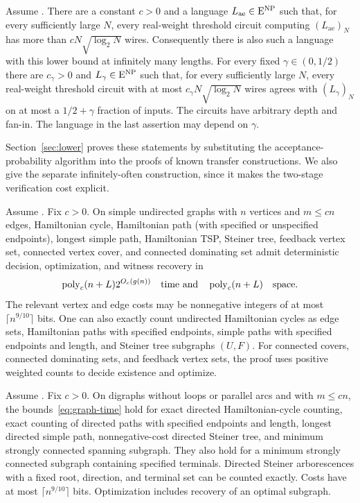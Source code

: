 \begin{theorem}
\label{thm:lower}
Assume \HTC. There are a constant $c>0$ and a language
$L_{\mathrm{ae}}\in\mathrm{E}^{\mathrm{NP}}$ such that, for every sufficiently large $N$,
every real-weight threshold circuit computing
$(L_{\mathrm{ae}})_N$ has more than $cN\sqrt{\log_2N}$ wires.
Consequently there is also such a language with this lower bound at
infinitely many lengths. For every fixed $\gamma\in(0,1/2)$ there are
$c_\gamma>0$ and $L_\gamma\in\mathrm{E}^{\mathrm{NP}}$ such that, for every sufficiently
large $N$, every real-weight threshold circuit with at most
$c_\gamma N\sqrt{\log_2N}$ wires agrees with $(L_\gamma)_N$ on at most
a $1/2+\gamma$ fraction of inputs. The circuits have arbitrary depth
and fan-in. The language in the last assertion may depend on $\gamma$.
\end{theorem}

Section~\ref{sec:lower} proves these statements by substituting the
acceptance-probability algorithm into the proofs of known transfer
constructions. We also give the separate infinitely-often construction,
since it makes the two-stage verification cost explicit.

\begin{theorem}
\label{thm:undirected}
Assume \HTC. Fix $c>0$. On simple undirected graphs with $n$ vertices
and $m\le cn$ edges, Hamiltonian cycle, Hamiltonian path (with specified
or unspecified endpoints), longest simple path, Hamiltonian TSP,
Steiner tree, feedback vertex set, connected vertex cover, and connected
dominating set admit deterministic decision, optimization, and witness
recovery in
\begin{equation}\label{eq:graph-time}
 \operatorname{poly}_c(n+L)2^{O_c(g(n))}\quad\hbox{time and}\quad\operatorname{poly}_c(n+L)
 \quad\hbox{space}.
\end{equation}
The relevant vertex and edge costs may be nonnegative integers of at
most $\lceil n^{9/10}\rceil$ bits. One can also exactly count undirected
Hamiltonian cycles as edge sets, Hamiltonian paths with specified
endpoints, simple paths with specified endpoints and length, and
Steiner tree subgraphs $(U,F)$. For connected covers, connected
dominating sets, and feedback vertex sets, the proof uses positive
weighted counts to decide existence and optimize.
\end{theorem}

\begin{theorem}
\label{thm:directed}
Assume \HTC. Fix $c>0$. On digraphs without loops or parallel arcs and
with $m\le cn$, the bounds~\eqref{eq:graph-time} hold for exact directed
Hamiltonian-cycle counting, exact counting of directed paths with
specified endpoints and length, longest directed simple path,
nonnegative-cost directed Steiner tree, and minimum strongly connected
spanning subgraph. They also hold for a minimum strongly connected
subgraph containing specified terminals. Directed Steiner arborescences
with a fixed root, direction, and terminal set can be counted exactly.
Costs have at most $\lceil n^{9/10}\rceil$ bits. Optimization includes
recovery of an optimal subgraph.
\end{theorem}

